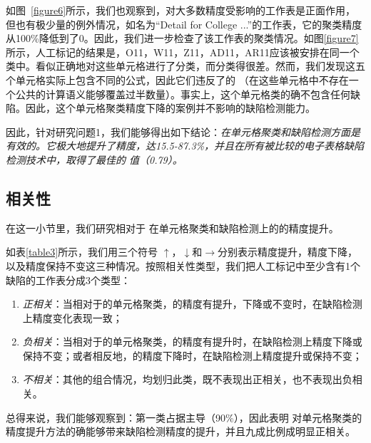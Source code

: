 


如图~\ref{figure6}所示，我们也观察到，\wa 对大多数精度受影响的工作表是正面作用，但也有极少量的例外情况，如名为“Detail for College ...”的工作表，它的聚类精度从100\%降低到了0。因此，我们进一步检查了该工作表的聚类情况。如图\ref{figure7}所示，人工标记的结果是，{O11，W11，Z11，AD11，AR11}应该被安排在同一个类中。\cu 看似正确地对这些单元格进行了分类，而\wa 分类得很差。然而，我们发现这五个单元格实际上包含不同的公式，因此它们违反了\wa 的 \wcvp （在这些单元格中不存在一个公共的计算语义能够覆盖过半数量）。事实上，这个单元格类的确不包含任何缺陷。因此，这个单元格聚类精度下降的案例并不影响\wa 的缺陷检测能力。

因此，针对研究问题1，我们能够得出如下结论：\textit{\wa 在单元格聚类和缺陷检测方面是有效的。它极大地提升了精度，达15.5-87.3\%，并且在所有被比较的电子表格缺陷检测技术中，取得了最佳的 \fmd 值（0.79）。}

\subsection{相关性}



在这一小节里，我们研究\wa 相对于 \cu 在单元格聚类和缺陷检测上的的精度提升。

如表\ref{table3}所示，我们用三个符号 $\uparrow$，$\downarrow$和$\to$分别表示精度提升，精度下降，以及精度保持不变这三种情况。按照相关性类型，我们把人工标记中至少含有1个缺陷的工作表分成3个类型：
\begin{enumerate}
    \item \textit{正相关}：当相对于\cu 的单元格聚类，\wa 的精度有提升，下降或不变时，在缺陷检测上精度变化表现一致；
    \item \textit{负相关}：当相对于\cu 的单元格聚类，\wa 的精度有提升时，在缺陷检测上精度下降或保持不变；或者相反地，\wa 的精度下降时，在缺陷检测上精度提升或保持不变；
    \item \textit{不相关}：其他的组合情况，均划归此类，既不表现出正相关，也不表现出负相关。
\end{enumerate}
总得来说，我们能够观察到：第一类占据主导（90\%），因此表明 \wa 对单元格聚类的精度提升方法的确能够带来缺陷检测精度的提升，并且九成比例成明显正相关。




